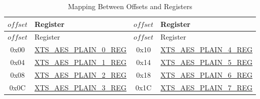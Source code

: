 \begin{longtable}[c]
{ |c|p{4.5cm} |c|p{4.5cm}|}
\caption{Mapping Between Offsets and Registers}
\label{tab:extmemencr-data-padding}\\
\hline
\rowcolor{lightgray}
\begin{math} offset \end{math}&  Register  & \begin{math} offset \end{math} &  Register \\\hline
\endfirsthead
\hline
\rowcolor{lightgray}
\begin{math} offset \end{math} &  Register  & \begin{math} offset \end{math} &  Register   \\\hline
\endhead
\endfoot
0x00 & \hyperref[regdesc:XTSAESPLAINNREG]{XTS\_AES\_PLAIN\_0\_REG} & 0x10 & \hyperref[regdesc:XTSAESPLAINNREG]{XTS\_AES\_PLAIN\_4\_REG} \\\hline
0x04 & \hyperref[regdesc:XTSAESPLAINNREG]{XTS\_AES\_PLAIN\_1\_REG} & 0x14 & \hyperref[regdesc:XTSAESPLAINNREG]{XTS\_AES\_PLAIN\_5\_REG} \\\hline
0x08 & \hyperref[regdesc:XTSAESPLAINNREG]{XTS\_AES\_PLAIN\_2\_REG} & 0x18 & \hyperref[regdesc:XTSAESPLAINNREG]{XTS\_AES\_PLAIN\_6\_REG} \\\hline
0x0C & \hyperref[regdesc:XTSAESPLAINNREG]{XTS\_AES\_PLAIN\_3\_REG} & 0x1C & \hyperref[regdesc:XTSAESPLAINNREG]{XTS\_AES\_PLAIN\_7\_REG} \\\hline
\end{longtable}
